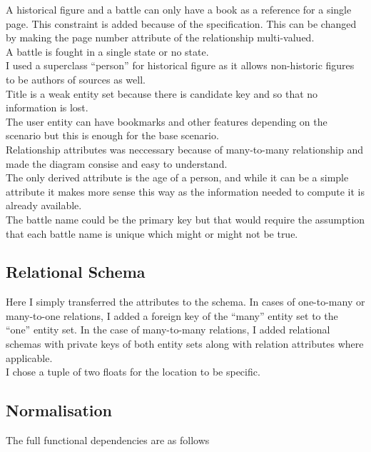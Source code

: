 \documentclass[11pt]{article}
\begin{document}
A historical figure and a battle can only have a book as a reference for a single page. This constraint is added because of the specification. This can be changed by making the page number attribute of the relationship multi-valued.\\

A battle is fought in a single state or no state.\\

I used a superclass ``person'' for historical figure as it allows non-historic figures to be authors of sources as well.\\

Title is a weak entity set because there is candidate key and so that no information is lost.\\

The user entity can have bookmarks and other features depending on the scenario but this is enough for the base scenario.\\

Relationship attributes was neccessary because of many-to-many relationship and made the diagram consise and easy to understand.\\

The only derived attribute is the age of a person, and while it can be a simple attribute it makes more sense this way as the information needed to compute it is already available.\\

The battle name could be the primary key but that would require the assumption that each battle name is unique which might or might not be true.

\subsection{Relational Schema}
\label{sec:org0e8dcb0}
Here I simply transferred the attributes to the schema. In cases of one-to-many or many-to-one relations, I added a foreign key of the ``many'' entity set to the ``one'' entity set. In the case of many-to-many relations, I added relational schemas with private keys of both entity sets along with relation attributes where applicable.\\

I chose a tuple of two floats for the location to be specific.
\subsection{Normalisation}
\label{sec:org97820c9}
The full functional dependencies are as follows
\end{document}
